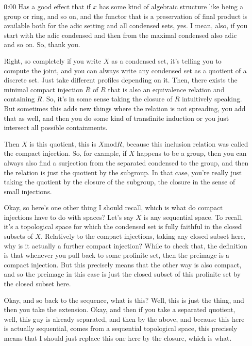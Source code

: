 \begin{unfinished}{0:00}
Has a good effect that if $x$ has some kind of algebraic structure like being a group or ring, and so on, and the functor that is a preservation of final product is available both for the adic setting and all condensed sets, yes. I mean, also, if you start with the adic condensed and then from the maximal condensed also adic and so on. So, thank you.

Right, so completely if you write $X$ as a condensed set, it's telling you to compute the joint, and you can always write any condensed set as a quotient of a discrete set. Just take different profiles depending on it. Then, there exists the minimal compact injection $\overline{R}$ of $R$ that is also an equivalence relation and containing $R$. So, it's in some sense taking the closure of $R$ intuitively speaking. But sometimes this adds new things where the relation is not spreading, you add that as well, and then you do some kind of transfinite induction or you just intersect all possible containments.

Then $X$ is this quotient, this is $X \text{mod} R$, because this inclusion relation was called the compact injection. So, for example, if $X$ happens to be a group, then you can always also find a surjection from the separated condensed to the group, and then the relation is just the quotient by the subgroup. In that case, you're really just taking the quotient by the closure of the subgroup, the closure in the sense of small injections.

Okay, so here's one other thing I should recall, which is what do compact injections have to do with spaces? Let's say $X$ is any sequential space. To recall, it's a topological space for which the condensed set is fully faithful in the closed subsets of $X$. Relatively to the compact injections, taking any closed subset here, why is it actually a further compact injection? While to check that, the definition is that whenever you pull back to some profinite set, then the preimage is a compact injection. But this precisely means that the other way is also compact, and so the preimage in this case is just the closed subset of this profinite set by the closed subset here.

Okay, and so back to the sequence, what is this? Well, this is just the thing, and then you take the extension. Okay, and then if you take a separated quotient, well, this guy is already separated, and then by the above, and because this here is actually sequential, comes from a sequential topological space, this precisely means that I should just replace this one here by the closure, which is what.


\end{unfinished}
